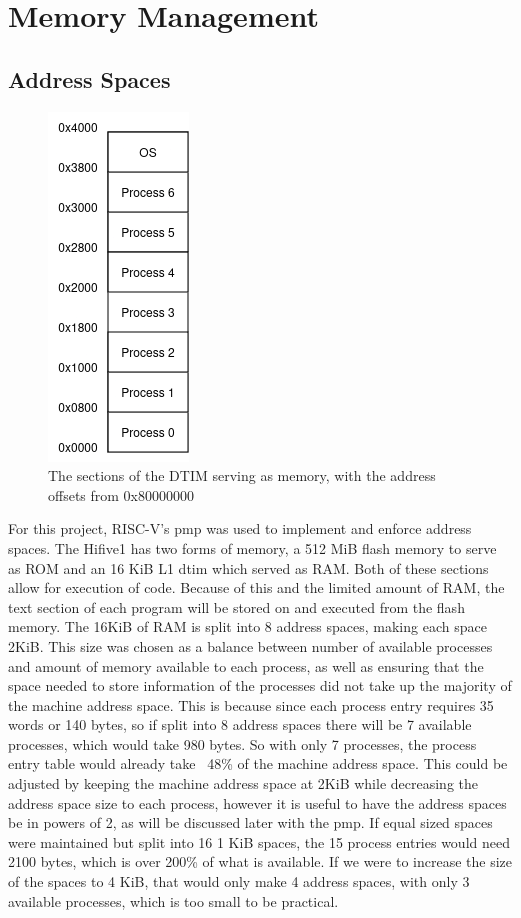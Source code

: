 \section{Memory Management}
\subsection{Address Spaces}
\begin{figure}[H]
    \includegraphics[height=0.3\textheight]{figures/dtim.png}
    \centering
    \caption[Layout of memory]{The sections of the DTIM serving as memory, with the address offsets from 0x80000000}
\end{figure}
For this project, RISC-V's \ac{pmp} was used to implement and enforce address spaces. The Hifive1 has two forms of memory, a 512 MiB flash memory to serve as ROM and an 16 KiB L1 \ac{dtim} which served as RAM. Both of these sections allow for execution of code. Because of this and the limited amount of RAM, the text section of each program will be stored on and executed from the flash memory. The 16KiB of RAM is split into 8 address spaces, making each space 2KiB. This size was chosen as a balance between number of available processes and amount of memory available to each process, as well as ensuring that the space needed to store information of the processes did not take up the majority of the machine address space. This is because since each process entry requires 35 words or 140 bytes, so if split into 8 address spaces there will be 7 available processes, which would take 980 bytes. So with only 7 processes, the process entry table would already take ~48\% of the machine address space. This could be adjusted by keeping the machine address space at 2KiB while decreasing the address space size to each process, however it is useful to have the address spaces be in powers of 2, as will be discussed later with the \ac{pmp}. If equal sized spaces were maintained but split into 16 1 KiB spaces, the 15 process entries would need 2100 bytes, which is over 200\% of what is available. If we were to increase the size of the spaces to 4 KiB, that would only make 4 address spaces, with only 3 available processes, which is too small to be practical.
